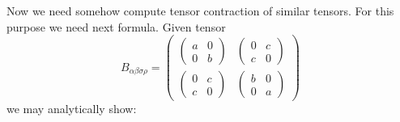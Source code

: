 \documentclass[12pt, notitlepage]{report}
\begin{document}
Now we need somehow compute tensor contraction of similar tensors. For this purpose we need next formula. Given tensor
$$
B_{\alpha\beta\sigma\rho} = \begin{pmatrix}
	\begin{pmatrix}
		a & 0 \\
		0 & b
	\end{pmatrix} & 
	\begin{pmatrix}
		0 & c \\
		c & 0
	\end{pmatrix} \\
	\begin{pmatrix}
		0 & c \\
		c & 0
	\end{pmatrix} &
	\begin{pmatrix}
		b & 0 \\
		0 & a
	\end{pmatrix}
\end{pmatrix}
$$
we may analytically show:
\end{document}
